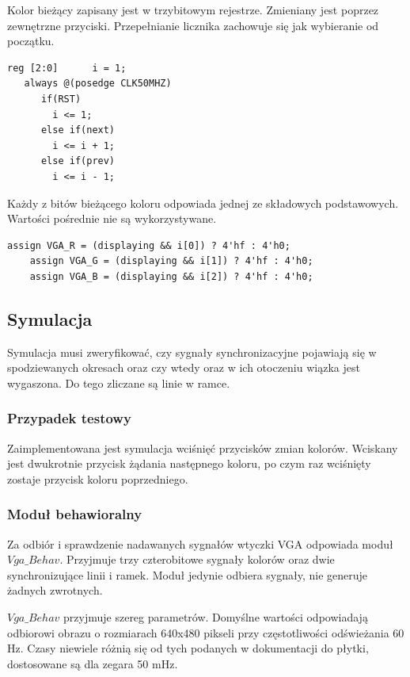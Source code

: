 \documentclass[a4paper,12pt]{article}
\begin{document}
Kolor bieżący zapisany jest w trzybitowym rejestrze. Zmieniany jest poprzez zewnętrzne przyciski. Przepełnianie licznika zachowuje się jak wybieranie od początku.
\begin{lstlisting}[label=Syncvga,caption=Sync.v,firstnumber=16]
   reg [2:0]      i = 1;
   always @(posedge CLK50MHZ)
      if(RST)
        i <= 1;
      else if(next)
        i <= i + 1;
      else if(prev)
        i <= i - 1;
\end{lstlisting}

Każdy z bitów bieżącego koloru odpowiada jednej ze składowych podstawowych. Wartości pośrednie nie są wykorzystywane.
\begin{lstlisting}[label=Syncvga,caption=Sync.v,firstnumber=25]
    assign VGA_R = (displaying && i[0]) ? 4'hf : 4'h0;
    assign VGA_G = (displaying && i[1]) ? 4'hf : 4'h0;
    assign VGA_B = (displaying && i[2]) ? 4'hf : 4'h0;
\end{lstlisting}

\subsection{Symulacja}
Symulacja musi zweryfikować, czy sygnały synchronizacyjne pojawiają się w spodziewanych okresach oraz czy wtedy oraz w ich otoczeniu wiązka jest wygaszona. Do tego zliczane są linie w ramce.

\subsubsection{Przypadek testowy}
Zaimplementowana jest symulacja wciśnięć przycisków zmian kolorów. Wciskany jest dwukrotnie przycisk żądania następnego koloru, po czym raz wciśnięty zostaje przycisk koloru poprzedniego.

\subsubsection{Moduł behawioralny}
Za odbiór i sprawdzenie nadawanych sygnałów wtyczki VGA odpowiada moduł $Vga\_Behav$. Przyjmuje trzy czterobitowe sygnały kolorów oraz dwie synchronizujące linii i ramek. Moduł jedynie odbiera sygnały, nie generuje żadnych zwrotnych.

$Vga\_Behav$ przyjmuje szereg parametrów. Domyślne wartości odpowiadają odbiorowi obrazu o rozmiarach 640x480 pikseli przy częstotliwości odświeżania 60 Hz. Czasy niewiele różnią się od tych podanych w dokumentacji do płytki, dostosowane są dla zegara 50 mHz.
\end{document}
